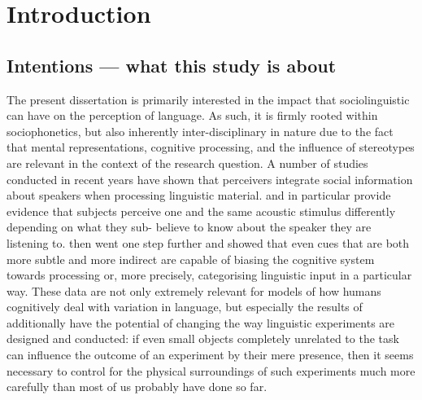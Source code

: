 \chapter{Introduction}
\label{ch.intro}

\section{Intentions --- what this study is about}
\label{sec.intro.intent}

The present dissertation is primarily interested in the impact that sociolinguistic  can have on the perception of language.
As such, it is firmly rooted within sociophonetics, but also inherently inter-disciplinary in nature due to the fact that mental representations, cognitive processing, and the influence of stereotypes are relevant in the context of the research question.
A number of studies conducted in recent years have shown that perceivers integrate social information about speakers when processing linguistic material.
\textcite{niedzielski1999} and \textcite{hayetal2006a} in particular provide evidence that subjects perceive one and the same acoustic stimulus differently depending on what they sub- believe to know about the speaker they are listening to.
\textcite{haydrager2010} then went one step further and showed that even cues that are both more subtle and more indirect are capable of biasing the cognitive system towards processing or, more precisely, categorising linguistic input in a particular way.
These data are not only extremely relevant for models of how humans cognitively deal with variation in language, but especially the results of \textcite{haydrager2010} additionally have the potential of changing the way linguistic experiments are designed and conducted: if even small objects completely unrelated to the task can influence the outcome of an experiment by their mere presence, then it seems necessary to control for the physical surroundings of such experiments much more carefully than most of us probably have done so far.

